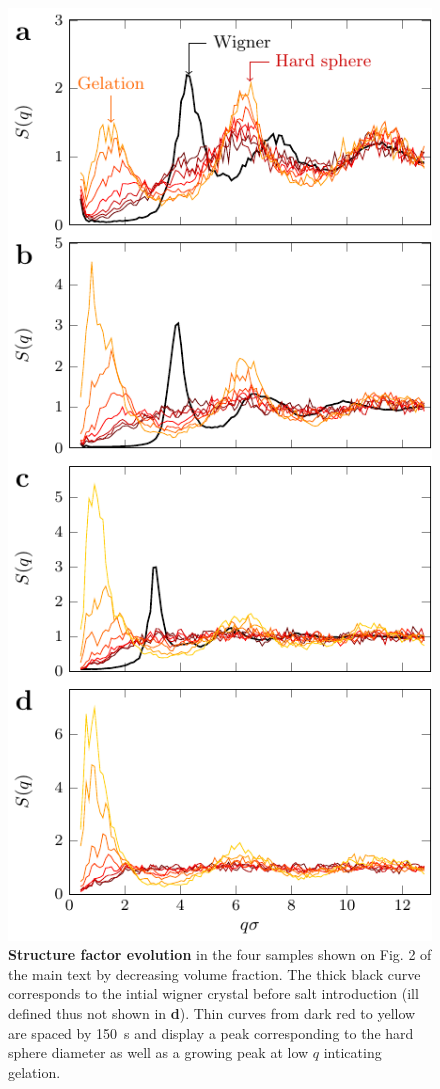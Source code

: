\documentclass[footinbib,amsmath,amssymb,%
superscriptaddress,twocolumn]{revtex4}
\begin{document}
\begin{figure}
\includegraphics{figs/structure_factor.pdf}
\caption{\textbf{Structure factor evolution} in the four samples shown on Fig. 2 of the main text by decreasing volume fraction. The thick black curve corresponds to the intial wigner crystal before salt introduction (ill defined thus not shown in \textbf{d}). Thin curves from dark red to yellow are spaced by \SI{150}{\second} and display a peak corresponding to the hard sphere diameter as well as a growing peak at low $q$ inticating gelation.}
\label{fig:structure_factor}
\end{figure}
\end{document}

